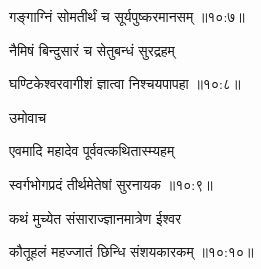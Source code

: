 {\devanagarifont गङ्गाग्निं सोमतीर्थं च सूर्यपुष्करमानसम् {॥१०:७॥} \veg\dontdisplaylinenum }%

{\devanagarifont नैमिषं बिन्दुसारं च सेतुबन्धं सुरद्रहम् \thinspace{\dandab} \dontdisplaylinenum }%


{\devanagarifont घण्टिकेश्वरवागीशं ज्ञात्वा निश्चयपापहा {॥१०:८॥} \veg\dontdisplaylinenum }%

{\devanagarifont उमोवाच {\dandab}\dontdisplaylinenum  }%
 
{\devanagarifont एवमादि महादेव पूर्ववत्कथितास्म्यहम् \thinspace{\danda} \dontdisplaylinenum }%


{\devanagarifont स्वर्गभोगप्रदं तीर्थमेतेषां सुरनायक {॥१०:९॥} \veg\dontdisplaylinenum }%

{\devanagarifont कथं मुच्येत संसाराज्ज्ञानमात्रेण ईश्वर \thinspace{\dandab} \dontdisplaylinenum }%


{\devanagarifont कौतूहलं महज्जातं छिन्धि संशयकारकम् {॥१०:१०॥} \veg\dontdisplaylinenum }%

